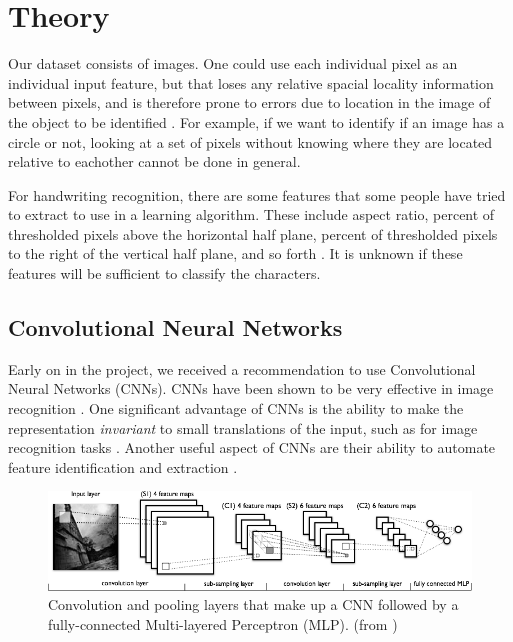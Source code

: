 \section{Theory}

Our dataset consists of images.  One could use each individual pixel as an individual input feature, but that loses any relative spacial locality information between pixels, and is therefore prone to errors due to location in the image of the object to be identified \cite{lecun1998gradient}.  For example, if we want to identify if an image has a circle or not, looking at a set of pixels without knowing where they are located relative to eachother cannot be done in general.

For handwriting recognition, there are some features that some people have tried to extract to use in a learning algorithm.  These include aspect ratio, percent of thresholded pixels above the horizontal half plane, percent of thresholded pixels to the right of the vertical half plane, and so forth \cite{web:wikihandwritfeat}.  It is unknown if these features will be sufficient to classify the characters.

\subsection{Convolutional Neural Networks}

Early on in the project, we received a recommendation to use Convolutional Neural Networks (CNNs).  CNNs have been shown to be very effective in image recognition \cite{korekado2003convolutional} \cite{ciresan2012multi}.  One significant advantage of CNNs is the ability to make the representation \emph{invariant} to small translations of the input, such as for image recognition tasks \cite{Bengio-et-al-2015-Book}.  Another useful aspect of CNNs are their ability to automate feature identification and extraction \cite{Bengio-et-al-2015-Book}.

\begin{figure}[ht]
  \centering
  \includegraphics[width=\textwidth]{images/mylenet.png}
  \caption{
    Convolution and pooling layers that make up a CNN followed by a
    fully-connected Multi-layered Perceptron (MLP).
    (from \cite{Bengio-et-al-2015-Book})
    }
  \label{fig:convnet}
\end{figure}

